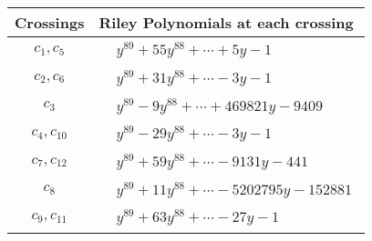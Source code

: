 \documentclass[1p]{elsarticle_modified}
\theoremstyle{definition}
\begin{document}
\begin{tabular}{m{50pt}|m{274pt}}
Crossings & \hspace{64pt}Riley Polynomials at each crossing \\
\hline $$\begin{aligned}c_{1},c_{5}\end{aligned}$$&$\begin{aligned}
&y^{89}+55 y^{88}+\cdots+5 y-1
\end{aligned}$\\
\hline $$\begin{aligned}c_{2},c_{6}\end{aligned}$$&$\begin{aligned}
&y^{89}+31 y^{88}+\cdots-3 y-1
\end{aligned}$\\
\hline $$\begin{aligned}c_{3}\end{aligned}$$&$\begin{aligned}
&y^{89}-9 y^{88}+\cdots+469821 y-9409
\end{aligned}$\\
\hline $$\begin{aligned}c_{4},c_{10}\end{aligned}$$&$\begin{aligned}
&y^{89}-29 y^{88}+\cdots-3 y-1
\end{aligned}$\\
\hline $$\begin{aligned}c_{7},c_{12}\end{aligned}$$&$\begin{aligned}
&y^{89}+59 y^{88}+\cdots-9131 y-441
\end{aligned}$\\
\hline $$\begin{aligned}c_{8}\end{aligned}$$&$\begin{aligned}
&y^{89}+11 y^{88}+\cdots-5202795 y-152881
\end{aligned}$\\
\hline $$\begin{aligned}c_{9},c_{11}\end{aligned}$$&$\begin{aligned}
&y^{89}+63 y^{88}+\cdots-27 y-1
\end{aligned}$\\
\hline
\end{tabular}
\vskip 2pc
\end{document}
